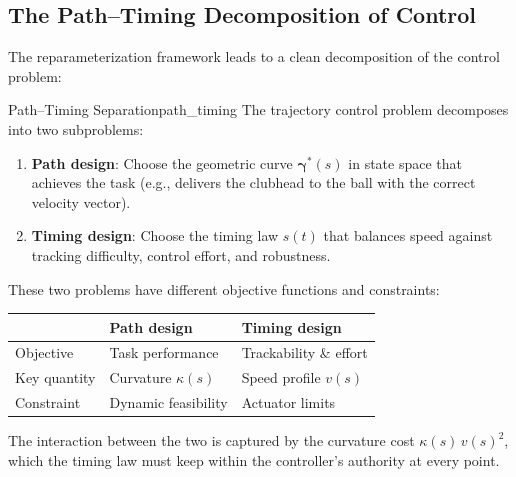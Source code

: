 \documentclass[12pt, openany]{book}
\theoremstyle{plain}
\newcommand{\traj}{\bm{\gamma}}
\begin{document}
\subsection{The Path--Timing Decomposition of Control}

The reparameterization framework leads to a clean decomposition of the
control problem:

\begin{principle}{Path--Timing Separation}{path_timing}
  The trajectory control problem decomposes into two subproblems:
  \begin{enumerate}[label=\textbf{(\Alph*)}]
    \item \textbf{Path design}: Choose the geometric curve $\traj^*(s)$ in state
      space that achieves the task (e.g., delivers the clubhead to the ball with
      the correct velocity vector).
    \item \textbf{Timing design}: Choose the timing law $s(t)$ that balances
      speed against tracking difficulty, control effort, and robustness.
  \end{enumerate}
  These two problems have different objective functions and constraints:
  \begin{center}
  \renewcommand{\arraystretch}{1.3}
  \begin{tabular}{@{} l l l @{}}
    \toprule
    & \textbf{Path design} & \textbf{Timing design} \\
    \midrule
    Objective & Task performance & Trackability \& effort \\
    Key quantity & Curvature $\kappa(s)$ & Speed profile $v(s)$ \\
    Constraint & Dynamic feasibility & Actuator limits \\
    \bottomrule
  \end{tabular}
  \end{center}
  The interaction between the two is captured by the curvature cost
  $\kappa(s)\, v(s)^2$, which the timing law must keep within the controller's
  authority at every point.
\end{principle}
\end{document}
